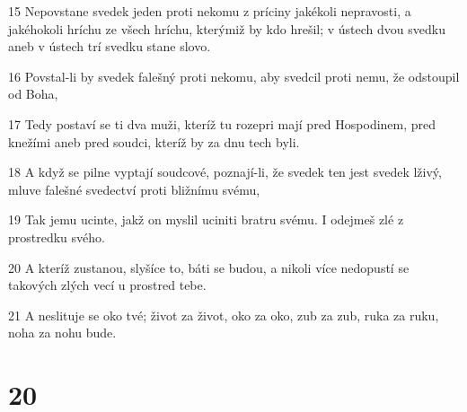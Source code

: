 \par 15 Nepovstane svedek jeden proti nekomu z príciny jakékoli nepravosti, a jakéhokoli hríchu ze všech hríchu, kterýmiž by kdo hrešil; v ústech dvou svedku aneb v ústech trí svedku stane slovo.
\par 16 Povstal-li by svedek falešný proti nekomu, aby svedcil proti nemu, že odstoupil od Boha,
\par 17 Tedy postaví se ti dva muži, kteríž tu rozepri mají pred Hospodinem, pred knežími aneb pred soudci, kteríž by za dnu tech byli.
\par 18 A když se pilne vyptají soudcové, poznají-li, že svedek ten jest svedek lživý, mluve falešné svedectví proti bližnímu svému,
\par 19 Tak jemu ucinte, jakž on myslil uciniti bratru svému. I odejmeš zlé z prostredku svého.
\par 20 A kteríž zustanou, slyšíce to, báti se budou, a nikoli více nedopustí se takových zlých vecí u prostred tebe.
\par 21 A neslituje se oko tvé; život za život, oko za oko, zub za zub, ruka za ruku, noha za nohu bude.

\chapter{20}

